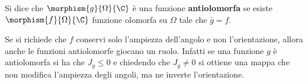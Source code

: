 \begin{definition}
  Si dice che $\morphism{g}{\Omega}{\C}$ è una funzione \textbf{antiolomorfa} se
  esiste $\morphism{f}{\Omega}{\C}$ funzione olomorfa su $\Omega$ tale che
  $\overline{g} = f$.
  \label{def:antiolomorfa}
\end{definition}

\begin{remark}
  Se si richiede che $f$ conservi solo l'ampiezza dell'angolo e non
  l'orientazione, allora anche le funzioni antiolomorfe giocano un ruolo.
  Infatti se una funzione $g$ è antiolomorfa si ha che $J_g \le 0$ e chiedendo
  che $J_g \neq 0$ si ottiene una mappa che non modifica l'ampiezza degli
  angoli, ma ne inverte l'orientazione.  
  \label{rmk:anticonformita}
\end{remark}

